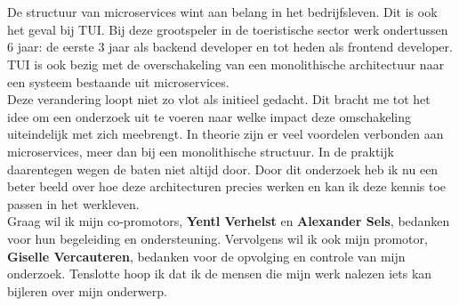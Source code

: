 
\chapter*{}
\label{ch:voorwoord}


De structuur van microservices wint aan belang in het bedrijfsleven. Dit is ook het geval bij TUI.
Bij deze grootspeler in de toeristische sector werk ondertussen 6 jaar: de eerste 3 jaar als backend developer en tot heden als frontend developer. TUI is ook bezig met de overschakeling van een monolithische architectuur naar een systeem bestaande uit microservices.\\
Deze verandering loopt niet zo vlot als initieel gedacht. Dit bracht me tot het idee om een onderzoek uit te voeren naar welke impact deze omschakeling uiteindelijk met zich meebrengt. In theorie zijn er veel voordelen verbonden aan microservices, meer dan bij een monolithische structuur. In de praktijk daarentegen wegen de baten niet altijd door. Door dit onderzoek heb ik nu een beter beeld over hoe deze architecturen precies werken en kan ik deze kennis toe passen in het werkleven.\\  
Graag wil ik mijn co-promotors, \textbf{Yentl Verhelst} en \textbf{Alexander Sels}, bedanken voor hun begeleiding en ondersteuning. Vervolgens wil ik ook mijn promotor, \textbf{Giselle Vercauteren}, bedanken voor de opvolging en controle van mijn onderzoek. Tenslotte hoop ik dat ik de mensen die mijn werk nalezen iets kan bijleren over mijn onderwerp.
